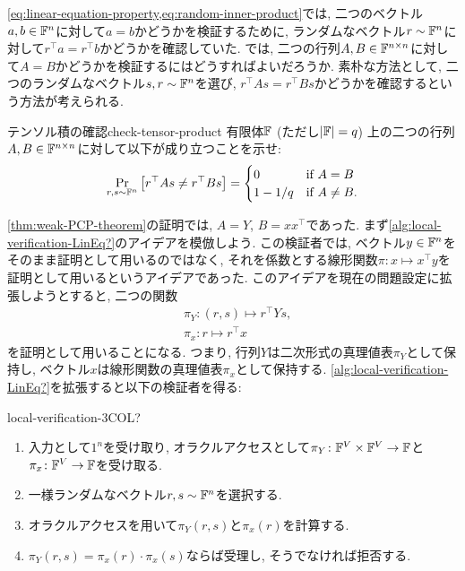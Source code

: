   \cref{eq:linear-equation-property,eq:random-inner-product}では,
  二つのベクトル$a,b\in\mathbb{F}^n$に対して$a=b$かどうかを検証するために, ランダムなベクトル$r\sim\mathbb{F}^n$に対して$r^\top a = r^\top b$かどうかを確認していた.
  では, 二つの行列$A,B\in\mathbb{F}^{n\times n}$に対して$A=B$かどうかを検証するにはどうすればよいだろうか.
  素朴な方法として, 二つのランダムなベクトル$s,r\sim \mathbb{F}^n$を選び, $r^\top A s = r^\top B s$かどうかを確認するという方法が考えられる.
  \begin{exercise}{テンソル積の確認}{check-tensor-product}
    有限体$\mathbb{F}$ (ただし$\abs{\mathbb{F}}=q$) 上の二つの行列$A,B\in\mathbb{F}^{n\times n}$に対して以下が成り立つことを示せ:
    \begin{align*}
      \Pr_{r,s\sim\mathbb{F}^n}\qty[ r^\top A s \ne r^\top B s ] = \begin{cases}
        0 & \text{if } A=B \\
        1-1/q & \text{if } A\ne B.
      \end{cases}
    \end{align*}
  \end{exercise}
  
  \cref{thm:weak-PCP-theorem}の証明では, $A=Y$, $B=x x^\top$であった.
  まず\cref{alg:local-verification-LinEq?}のアイデアを模倣しよう.
  この検証者では, ベクトル$y\in\mathbb{F}^n$をそのまま証明として用いるのではなく, それを係数とする線形関数$\pi\colon x\mapsto x^\top y$を証明として用いるというアイデアであった.
  このアイデアを現在の問題設定に拡張しようとすると,
  二つの関数
  \begin{align*}
    &\pi_Y \colon (r,s)\mapsto r^\top Y s,\\
    &\pi_x \colon r\mapsto r^\top x
  \end{align*}
  を証明として用いることになる.
  つまり, 行列$Y$は二次形式の真理値表$\pi_Y$として保持し,
  ベクトル$x$は線形関数の真理値表$\pi_x$として保持する.
  \cref{alg:local-verification-LinEq?}を拡張すると以下の検証者を得る:
  \begin{algorithm}{}{local-verification-3COL?}
    \begin{enumerate}
      \item 入力として$1^n$を受け取り, オラクルアクセスとして$\pi_Y\colon\mathbb{F}^V\times\mathbb{F}^V\to\mathbb{F}$と$\pi_x\colon\mathbb{F}^V\to\mathbb{F}$を受け取る.
      \item 一様ランダムなベクトル$r,s\sim\mathbb{F}^n$を選択する.
      \item オラクルアクセスを用いて$\pi_Y(r,s)$と$\pi_x(r)$を計算する.
      \item $\pi_Y(r,s)=\pi_x(r)\cdot \pi_x(s)$ならば受理し, そうでなければ拒否する.
    \end{enumerate}
  \end{algorithm}
  
  
  
  
  



